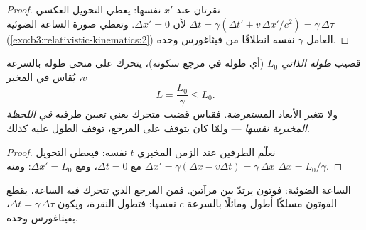 \begin{proof}
نقرتان عند $x'$ نفسها: يعطي التحويل العكسي $\Delta t
= \gamma(\Delta t' + v\,\Delta x'/c^2) = \gamma\,\Delta\tau$ لأن
$\Delta x' = 0$. وتعطي صورة الساعة الضوئية
(\cref{exo:b3:relativistic-kinematics:2}) العامل $\gamma$ نفسه
انطلاقًا من فيثاغورس وحده.
\end{proof}

\begin{proposition}\label{prop:b3:relativistic-kinematics:contraction}
قضيب \emph{طوله الذاتي} $L_0$ (أي طوله في مرجع سكونه)،
يتحرك على منحى طوله بالسرعة $v$، يُقاس في المخبر
\[
L = \frac{L_0}{\gamma} \le L_0 .
\]
ولا تتغير الأبعاد المستعرضة. فقياس قضيب متحرك يعني تعيين طرفيه
\emph{في اللحظة المخبرية نفسها} --- ولمّا كان  يتوقف على
المرجع، توقف الطول عليه كذلك.
\end{proposition}

\begin{proof}
نعلّم الطرفين عند الزمن المخبري $t$ نفسه: فيعطي التحويل
$\Delta x' = \gamma(\Delta x - v\Delta t) = \gamma\,\Delta x$ مع
$\Delta t = 0$، ومع $\Delta x' = L_0$: ومنه $\Delta x = L_0/\gamma$.
\end{proof}

\begin{omfigure}

{\small الساعة الضوئية: فوتون يرتدّ بين مرآتين. فمن المرجع الذي
تتحرك فيه الساعة، يقطع الفوتون مسلكًا أطول ومائلًا بالسرعة
$c$ نفسها: فتطول النقرة، ويكون
$\Delta t = \gamma\,\Delta\tau$، بفيثاغورس وحده.}
\end{omfigure}

